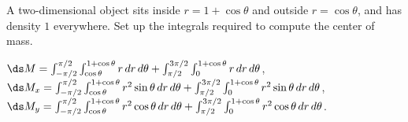 \begin{enumialphparenastyle}
\begin{ex}
A two-dimensional object sits inside $r=1+\cos\theta$
and outside $r=\cos\theta$, and has density $1$ everywhere.
Set up
the integrals required to compute the center of mass.
\begin{sol}
$\ds M= \int_{-\pi/2}^{\pi/2}\int_{\cos\theta}^{1+\cos\theta}
r\,dr\,d\theta + \int_{\pi/2}^{3\pi/2}\int_0^{1+\cos\theta}r\,dr\,d\theta$,
\hfill\break
$\ds M_x=\int_{-\pi/2}^{\pi/2}\int_{\cos\theta}^{1+\cos\theta}
r^2\sin\theta\,dr\,d\theta + \int_{\pi/2}^{3\pi/2}\int_0^{1+\cos\theta}r^2\sin\theta\,dr\,d\theta$,
\hfill\break
$\ds M_y=\int_{-\pi/2}^{\pi/2}\int_{\cos\theta}^{1+\cos\theta}
r^2\cos\theta\,dr\,d\theta + \int_{\pi/2}^{3\pi/2}\int_0^{1+\cos\theta}r^2\cos\theta\,dr\,d\theta$.
\end{sol}
\end{ex}

\end{enumialphparenastyle}
